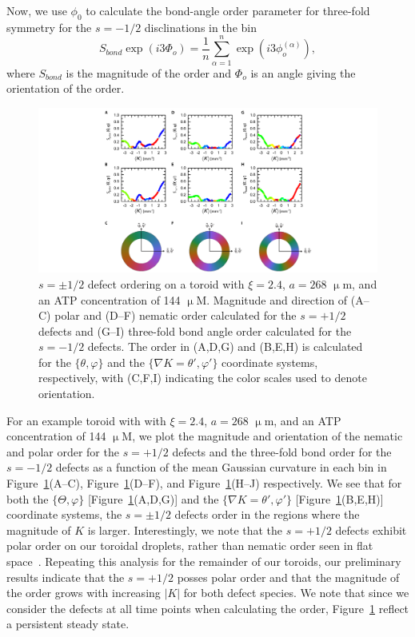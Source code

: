 Now, we use $\phi_0$ to calculate the bond-angle order parameter for three-fold symmetry for the $s = -1/2$ disclinations in the bin
\begin{equation}\label{e:7-hexorder}
  S_{bond} \exp(i 3 \Phi_o) = \frac{1}{n}\sum\limits_{\alpha = 1}^n \exp (i 3 \phi_o^{(\alpha)}),
\end{equation}
where $S_{bond}$ is the magnitude of the order and $\Phi_o$ is an angle giving the orientation of the order.
\begin{figure}
  \centering
  \includegraphics[width=\textwidth]{figures/C7/Ch7-Figs_Orient_MeanK.png}
  \caption{$s = \pm 1/2$ defect ordering on a toroid with $\xi = 2.4$, $a = 268$ $\upmu$m, and an ATP concentration of 144 $\upmu$M.
  Magnitude and direction of (A--C) polar and (D--F) nematic order calculated for the $s = +1/2$ defects and (G--I) three-fold bond angle order calculated for the $s = -1/2$ defects.
  The order in (A,D,G) and (B,E,H) is calculated for the $\{\theta,\varphi \}$ and the $\{\nabla K = \theta',\varphi' \}$ coordinate systems, respectively, with (C,F,I) indicating the color scales used to denote orientation.
  }\label{f:7-Orient_MeanK}
\end{figure}

For an example toroid with with $\xi = 2.4$, $a = 268$ $\upmu$m, and an ATP concentration of 144 $\upmu$M, we plot the magnitude and orientation of the nematic and polar order for the $s = +1/2$ defects and the three-fold bond order for the $s = -1/2$ defects as a function of the mean Gaussian curvature in each bin  in Figure~\ref{f:7-Orient_MeanK}(A--C), Figure~\ref{f:7-Orient_MeanK}(D--F), and Figure~\ref{f:7-Orient_MeanK}(H--J) respectively.
We see that for both the $\{\Theta,\varphi\}$ [Figure~\ref{f:7-Orient_MeanK}(A,D,G)] and the $\{ \nabla K = \theta',\varphi' \}$ [Figure~\ref{f:7-Orient_MeanK}(B,E,H)] coordinate systems, the $s = \pm 1/2$ defects order in the regions where the magnitude of $K$ is larger.
Interestingly, we note that the $s = +1/2$ defects exhibit polar order on our toroidal droplets, rather than nematic order seen in flat space~\cite{RN27}.
Repeating this analysis for the remainder of our toroids, our preliminary results indicate that the $s = +1/2$ posses polar order and that the magnitude of the order grows with increasing $|K|$ for both defect species.
We note that since we consider the defects at all time points when calculating the order, Figure~\ref{f:7-Orient_MeanK} reflect a persistent steady state.


